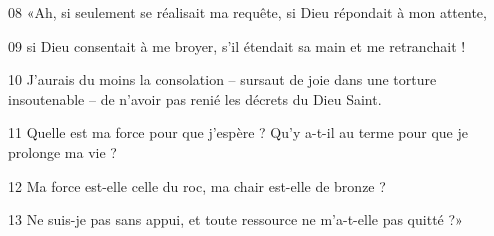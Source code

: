 
08 «Ah, si seulement se réalisait ma requête, si Dieu répondait à mon attente,

09 si Dieu consentait à me broyer, s’il étendait sa main et me retranchait !

10 J’aurais du moins la consolation – sursaut de joie dans une torture insoutenable – de n’avoir pas renié les décrets du Dieu Saint.

11 Quelle est ma force pour que j’espère ? Qu’y a-t-il au terme pour que je prolonge ma vie ?

12 Ma force est-elle celle du roc, ma chair est-elle de bronze ?

13 Ne suis-je pas sans appui, et toute ressource ne m’a-t-elle pas quitté ?»